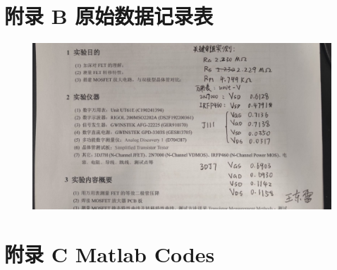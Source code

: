 \documentclass[UTF8]{article}
\begin{document}
\newpage
\section*{附录 B\hspace*{20pt} 原始数据记录表}
\thispagestyle{fancy} 
\begin{figure}[H]\centering
    \includegraphics[width=0.9\columnwidth]{LCE-04-场效应管/assets/appendix/原始数据.png}
\end{figure}

\section*{附录 C \hspace*{20pt} Matlab Codes}
\thispagestyle{fancy} 

\end{document}
